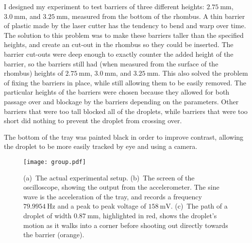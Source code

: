 I designed my experiment to test barriers of three different heights: $2.75~\mathrm{mm}$, $3.0~\mathrm{mm}$, and $3.25~\mathrm{mm}$, measured from the bottom of the rhombus. A thin barrier of plastic made by the laser cutter has the tendency to bend and warp over time. The solution to this problem was to make these barriers taller than the specified heights, and create an cut-out in the rhombus so they could be inserted. The barrier cut-outs were deep enough to exactly counter the added height of the barrier, so the barriers still had (when measured from the surface of the rhombus) heights of $2.75~\mathrm{mm}$, $3.0~\mathrm{mm}$, and $3.25~\mathrm{mm}$. This also solved the problem of fixing the barriers in place, while still allowing them to be easily removed. The particular heights of the barriers were chosen because they allowed for both passage over and blockage by the barriers depending on the parameters. Other barriers that were too tall blocked all of the droplets, while barriers that were too short did nothing to prevent the droplet from crossing over.

The bottom of the tray was painted black in order to improve contrast, allowing the droplet to be more easily tracked by eye and using a camera.

\begin{figure}[h!]
	\centering
	\texttt{[image: group.pdf]}
	\caption{(a)~The actual experimental setup. 
	(b)~The screen of the oscilloscope, showing the output from the accelerometer. The sine wave is the acceleration of the tray, and records a frequency $79.9954~\mathrm{Hz}$ and a peak to peak voltage of $158~\mathrm{mV}$. 
	(c)~The path of a droplet of width $0.87~\mathrm{mm}$, highlighted in red, shows the droplet's motion as it walks into a corner before shooting out directly towards the barrier (orange).}
	\label{group}
\end{figure}

